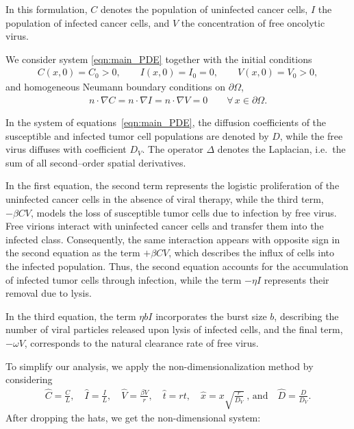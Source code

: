 \documentclass[11pt]{article}
\theoremstyle{definition}
\begin{document}
In this formulation, \(C\) denotes the population of uninfected cancer cells, \(I\) the population of infected cancer cells, and \(V\) the concentration of free oncolytic virus.  

We consider system \eqref{eqn:main_PDE} together with the initial conditions
\begin{align*}
    C(x,0)=C_0>0, \qquad 
    I(x,0)=I_0=0, \qquad 
    V(x,0)=V_0>0,
\end{align*}
and homogeneous Neumann boundary conditions on $\partial \Omega$,
\begin{align*}
    n \cdot \nabla C = 
    n \cdot \nabla I = 
    n \cdot \nabla V = 0 
    \qquad \forall\, x \in \partial \Omega.
\end{align*}


In the system of equations~\eqref{eqn:main_PDE}, the diffusion coefficients of the susceptible and infected tumor cell populations are denoted by $D$, while the free virus diffuses with coefficient $D_V$. The operator $\Delta$ denotes the Laplacian, i.e.\ the sum of all second–order spatial derivatives.

In the first equation, the second term represents the logistic proliferation of the uninfected cancer cells in the absence of viral therapy, while the third term, $-\beta C V$, models the loss of susceptible tumor cells due to infection by free virus. Free virions interact with uninfected cancer cells and transfer them into the infected class. Consequently, the same interaction appears with opposite sign in the second equation as the term $+\beta C V$, which describes the influx of cells into the infected population. Thus, the second equation accounts for the accumulation of infected tumor cells through infection, while the term $-\eta I$ represents their removal due to lysis.

In the third equation, the term $\eta b I$ incorporates the burst size $b$, describing the number of viral particles released upon lysis of infected cells, and the final term, $-\omega V$, corresponds to the natural clearance rate of free virus.

To simplify our analysis, we apply the non-dimensionalization method by considering
\begin{align*}
    \hat{C}=\frac{C}{L}, \quad \hat{I}=\frac{I}{L}, \quad\hat{V}=\frac{\beta V}{r},\quad \hat{t}=r t,\quad \hat x=  x\sqrt{ \frac{r}{D_V}} \  \text{, and} \quad \hat D= \frac{D}{D_V}.
\end{align*} 
After dropping the hats, we get the non-dimensional system:
\end{document}
